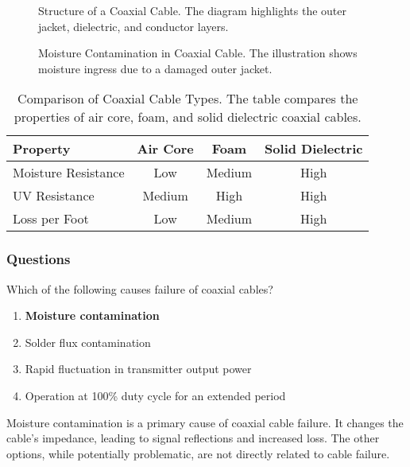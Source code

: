 \begin{figure}[h]
    \centering
    \caption{Structure of a Coaxial Cable. The diagram highlights the outer jacket, dielectric, and conductor layers.}
    \label{fig:coax-structure}
\end{figure}

\begin{figure}[h]
    \centering
    \caption{Moisture Contamination in Coaxial Cable. The illustration shows moisture ingress due to a damaged outer jacket.}
    \label{fig:coax-moisture}
\end{figure}

\begin{table}[h]
    \centering
    \begin{tabular}{|l|c|c|c|}
        \hline
        \textbf{Property} & \textbf{Air Core} & \textbf{Foam} & \textbf{Solid Dielectric} \\
        \hline
        Moisture Resistance & Low & Medium & High \\
        UV Resistance & Medium & High & High \\
        Loss per Foot & Low & Medium & High \\
        \hline
    \end{tabular}
    \caption{Comparison of Coaxial Cable Types. The table compares the properties of air core, foam, and solid dielectric coaxial cables.}
    \label{tab:coax-comparison}
\end{table}

\subsubsection*{Questions}

\begin{tcolorbox}[colback=gray!10!white,colframe=black!75!black,title={T7C09}]
    Which of the following causes failure of coaxial cables?
    \begin{enumerate}[label=\Alph*),noitemsep]
        \item \textbf{Moisture contamination}
        \item Solder flux contamination
        \item Rapid fluctuation in transmitter output power
        \item Operation at 100\% duty cycle for an extended period
    \end{enumerate}
\end{tcolorbox}
Moisture contamination is a primary cause of coaxial cable failure. It changes the cable's impedance, leading to signal reflections and increased loss. The other options, while potentially problematic, are not directly related to cable failure.

